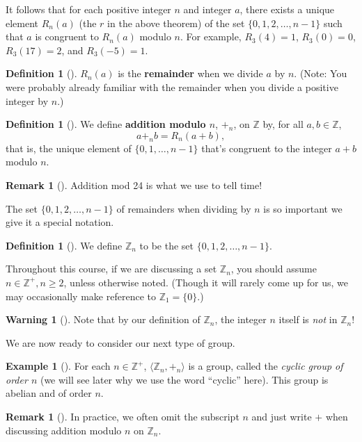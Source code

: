 \documentclass[10pt,]{book}
\newcommand{\terminology}[1]{\textbf{#1}}
\theoremstyle{plain}
\theoremstyle{definition}
\newtheorem{definition}[theorem]{Definition}
\theoremstyle{definition}
\newtheorem{remark}[theorem]{Remark}
\newtheorem{warning}[theorem]{Warning}
\theoremstyle{definition}
\newtheorem{example}[theorem]{Example}
\theoremstyle{definition}
\numberwithin{equation}{section}
\def\Z{\mathbb{Z}}
\begin{document}
It follows that for each positive integer \(n\) and integer \(a\), there exists a unique element \(R_n(a)\) (the \(r\) in the above theorem) of the set \(\{0,1,2,\ldots, n-1\}\) such that \(a\) is congruent to \(R_n(a)\) modulo \(n\). For example, \(R_3(4)=1\), \(R_3(0)=0\), \(R_3(17)=2\), and \(R_3(-5)=1\).%
\begin{definition}[{}]\label{definition-25}
\(R_n(a)\) is the \terminology{remainder} when we divide \(a\) by \(n\). (Note: You were probably already familiar with the remainder when you divide a positive integer by \(n\).)%
\end{definition}
\begin{definition}[{}]\label{definition-26}
We define \terminology{addition modulo \(n\)}, \(+_n\), on \(\Z\) by, for all \(a,b\in \Z\),%
\begin{equation*}
a+_n b=R_n(a+b),
\end{equation*}
that is, the unique element of \(\{0,1,\ldots, n-1\}\) that's congruent to the integer \(a+b\) modulo \(n\).%
\end{definition}
\begin{remark}[]\label{remark-13}
Addition mod 24 is what we use to tell time!%
\end{remark}
The set \(\{0,1,2,\ldots, n-1\}\) of remainders when dividing by \(n\) is so important we give it a special notation.%
\begin{definition}[{}]\label{definition-27}
We define \(\Z_n\) to be the set \(\{0,1,2,\ldots,n-1\}\).%
\end{definition}
Throughout this course, if we are discussing a set \(\Z_n\), you should assume \(n\in \Z^+, n\geq 2\), unless otherwise noted. (Though it will rarely come up for us, we may occasionally make reference to \(\Z_1=\{0\}\).)%
\begin{warning}[]\label{warning-10}
Note that by our definition of \(\Z_n\), the integer \(n\) itself is \emph{not} in \(\Z_n\)!%
\end{warning}
We are now ready to consider our next type of group.%
\begin{example}[]\label{example-16}
For each \(n\in \Z^+\), \(\langle \Z_n,+_n\rangle\) is a group, called the \emph{cyclic group of order \(n\)} (we will see later why we use the word ``cyclic'' here). This group is abelian and of order \(n\).%
\end{example}
\begin{remark}[]\label{remark-14}
In practice, we often omit the subscript \(n\) and just write \(+\) when discussing addition modulo \(n\) on \(\Z_n\).%
\end{remark}
\end{document}
